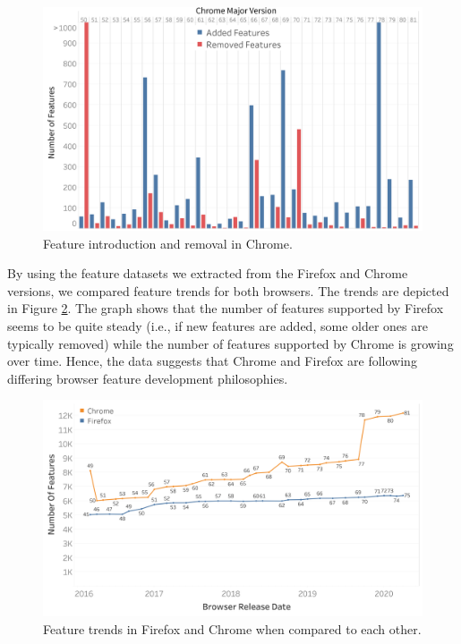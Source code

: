 \begin{figure}[ht]
    \centering
    \includegraphics[width=\columnwidth]{figures/Chrome-add-remove.png}
    \caption{Feature introduction and removal in Chrome.}
    \label{fig:chaddremove}
\end{figure}

By using the feature datasets we extracted from the Firefox and Chrome
versions, we compared feature trends for both browsers. The trends are
depicted in Figure \ref{fig:featuretrends}. The graph shows that the
  number of features supported by Firefox seems to be quite steady
  (i.e., if new features are added, some older ones are typically
  removed) while the number of features supported by Chrome is growing
  over time. Hence, the data suggests that Chrome and Firefox are
  following differing browser feature development philosophies.

\begin{figure}[ht]
    \centering
    \includegraphics[width=\columnwidth]{figures/Feature-Trends.PNG}
    \caption{Feature trends in Firefox and Chrome when compared to
      each other.}
    \label{fig:featuretrends}
\end{figure}
